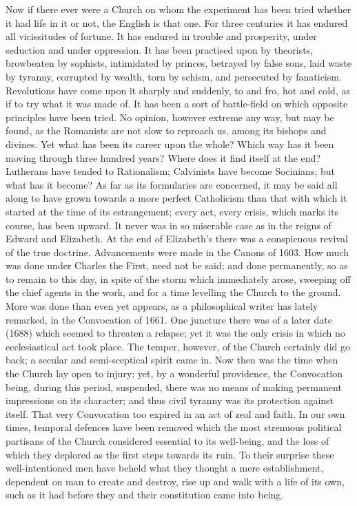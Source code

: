 Now if there ever were a Church on whom the
experiment has been tried whether it had life in it or not, the
English is that one. For three centuries it has endured all
vicissitudes of fortune. It has endured in trouble and prosperity,
under seduction and under oppression. It has been practised upon by
theorists, browbeaten by sophists, intimidated by princes, betrayed by
false sons, laid waste by tyranny, corrupted by wealth, torn by
schism, and persecuted by fanaticism. Revolutions have come upon it
sharply and suddenly, to and fro, hot and cold, as if to try what it
was made of. It has been a sort of battle-field on which opposite
principles have been tried. No opinion, however extreme any way, but
may be found, as the Romanists are not slow to reproach us, among its
bishops and divines. Yet what has been its career upon the whole?
Which way has it been moving through three hundred years? Where does
it find itself at the end? Lutherans have tended to Rationalism;
Calvinists have become Socinians; but what has it become? As far as
its formularies are concerned, it may be said all along to have grown
towards a more perfect Catholicism than that with which it started at
the time of its estrangement; every act, every crisis, which marks its
course, has been upward. It never was in so miserable case as in the
reigns of Edward and Elizabeth. At the end of Elizabeth's there was
a conspicuous revival of the true doctrine. Advancements were made in
the Canons of 1603. How much was done under Charles the First, need
not be said; and done permanently, so as to remain to this day, in
spite of the storm which immediately arose, sweeping off the chief
agents in the work, and for a time levelling the Church to the ground.
More was done than even yet appears, as a philosophical writer has
lately remarked, in the Convocation of 1661. One juncture there
was of a later date (1688) which seemed to threaten a relapse; yet it
was the only crisis in which no ecclesiastical act took place. The
temper, however, of the Church certainly did go back; a secular and
semi-sceptical spirit came in. Now then was the time when the Church
lay open to injury; yet, by a wonderful providence, the Convocation
being, during this period, suspended, there was no means of making
permanent impressions on its character; and thus civil tyranny was its
protection against itself. That very Convocation too expired in an act
of zeal and faith. In our own times, temporal defences have been
removed which the most strenuous political partisans of the Church
considered essential to its well-being, and the loss of which they
deplored as the first steps towards its ruin. To their surprise these
well-intentioned men have beheld what they thought a mere
establishment, dependent on man to create and destroy, rise up and
walk with a life of its own, such as it had before they and their
constitution came into being.

